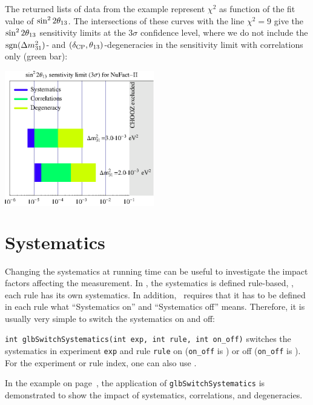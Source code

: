 {The returned lists of data from the example represent $\chi^2$ 
as function of the fit value of $\sin^2 2 \theta_{13}$. The intersections of these
curves with the line $\chi^2 = 9$ give the $\sin^2 2 \theta_{13}$ sensitivity
limits at the $3 \sigma$ confidence level, where we do not include the
 $\mathrm{sgn}(\Delta m_{31}^2)$- and $(\delta_{\mathrm{CP}},\theta_{13})$-degeneracies in the sensitivity limit with correlations only (green bar):
\begin{center}
\colorbox{white}{\includegraphics[width=6.5cm]{barsex}}
\end{center}
}

\section{Systematics}
\label{sec:systematics}

Changing the systematics at running time can be useful to investigate
the impact factors affecting the measurement.
In \GLOBES , the systematics is defined rule-based, \ie, each rule
has its own systematics. In addition, \AEDL\ requires that it has to be
defined in each rule what ``Systematics on'' and ``Systematics off'' means.
Therefore, it is usually very simple to switch the systematics on and off:
\begin{function}
{\tt int glbSwitchSystematics(int exp, int rule, int on\_off)}
switches the systematics in experiment {\tt exp} and rule {\tt rule}
on ({\tt on\_off} is ) or off ({\tt on\_off} is ). For the experiment or
rule index, one can also use . 
\end{function}
In the example on page~\pageref{ex:barcharts}, the application of
{\tt glbSwitchSystematics} is demonstrated to show the impact of
systematics, correlations, and degeneracies.

